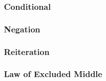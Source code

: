 \separatepfs
\begin{multicols}{2}
\subsubsection*{Conditional}

\begin{fitchproof}
	\open
		\ellipsesline
	\close
\end{fitchproof}

\vfill\null
\columnbreak

\begin{fitchproof}
	 
\end{fitchproof}
\end{multicols}

\separatepfs
\begin{multicols}{2}
\subsubsection*{Negation}

\begin{fitchproof}
\open
	\ellipsesline
\close
{}
\end{fitchproof}

\columnbreak

\begin{fitchproof}
\open
	\ellipsesline
\close
{}
\end{fitchproof}
\end{multicols}
\separatepfs
\begin{multicols}{2}
\subsubsection*{Reiteration}

\begin{fitchproof}
	 
\end{fitchproof}

\subsubsection*{Law of Excluded Middle}
\begin{fitchproof}
	\LEM
\end{fitchproof}
\end{multicols}



